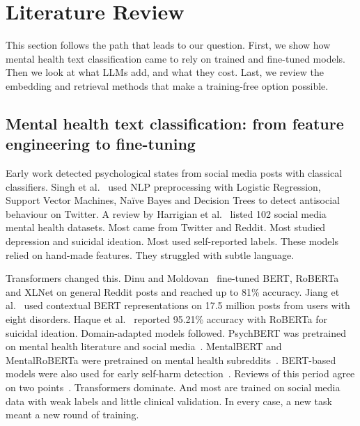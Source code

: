 \documentclass[11pt]{article}
\begin{document}
\section{Literature Review}\label{sec:lit}

This section follows the path that leads to our question. First, we show how mental health text
classification came to rely on trained and fine-tuned models. Then we look at what LLMs add, and
what they cost. Last, we review the embedding and retrieval methods that make a training-free
option possible.

\subsection{Mental health text classification: from feature engineering to fine-tuning}

Early work detected psychological states from social media posts with classical classifiers. Singh
et al.~\cite{singh2020framework} used NLP preprocessing with Logistic Regression, Support Vector
Machines, Na\"{i}ve Bayes and Decision Trees to detect antisocial behaviour on Twitter. A review by
Harrigian et al.~\cite{harrigian2021state} listed 102 social media mental health datasets. Most came
from Twitter and Reddit. Most studied depression and suicidal ideation. Most used self-reported
labels. These models relied on hand-made features. They struggled with subtle language.

Transformers changed this. Dinu and Moldovan~\cite{dinu2021automatic} fine-tuned BERT, RoBERTa and
XLNet on general Reddit posts and reached up to 81\% accuracy. Jiang et
al.~\cite{jiang-etal-2020-detection} used contextual BERT representations on 17.5 million posts
from users with eight disorders. Haque et al.~\cite{suicidalideationtransformers2020} reported
95.21\% accuracy with RoBERTa for suicidal ideation. Domain-adapted models followed. PsychBERT was
pretrained on mental health literature and social media~\cite{vajre2021psychbert}. MentalBERT and
MentalRoBERTa were pretrained on mental health subreddits~\cite{ji2022mentalbert}. BERT-based models
were also used for early self-harm detection~\cite{martinez2022early}. Reviews of this period agree
on two points~\cite{zhang2022natural,montejo2024survey,greco2023transformer}. Transformers dominate.
And most are trained on social media data with weak labels and little clinical validation. In every
case, a new task meant a new round of training.
\end{document}
